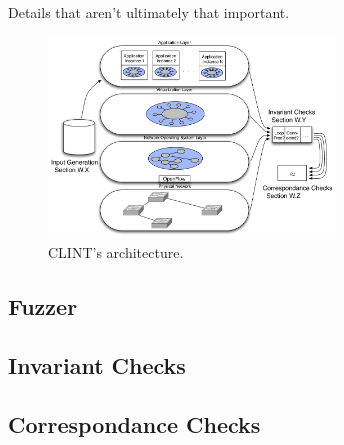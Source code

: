 Details that aren't ultimately that important.

\begin{figure}[t]
    \centering
    \includegraphics[width=3in]{../diagrams/architecture/Architecture_simplified.pdf}
    \caption[]{\label{fig:basicarch} CLINT's architecture. \vspace{-10pt}} 
\end{figure}



\subsection{Fuzzer}

\subsection{Invariant Checks}

\subsection{Correspondance Checks}

